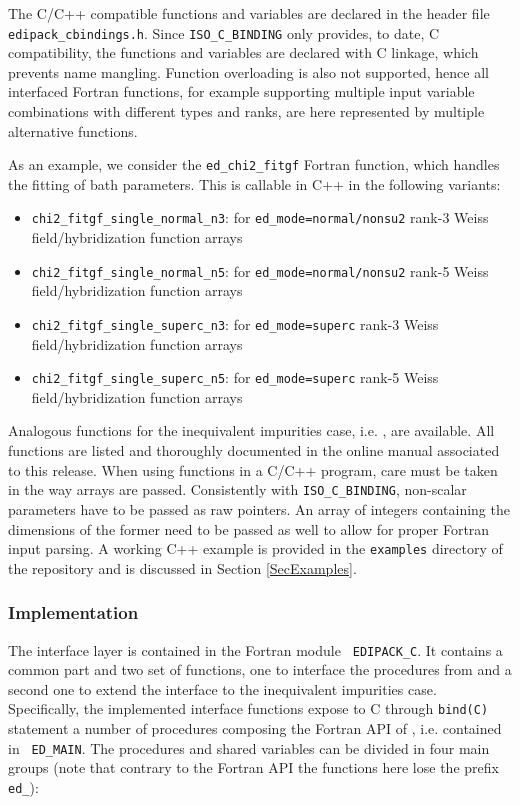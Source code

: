 \documentclass[edipack_sp.tex]{subfiles}
\begin{document}
The C/C++ compatible functions and variables 
are declared in the header file {\tt e\-di\-pack\_c\-bin\-din\-gs.h}.
Since {\tt ISO\_C\_BINDING} only provides, to date, C compatibility, the 
functions and variables are declared with C linkage, which prevents name mangling.
Function overloading is also not supported, hence all interfaced Fortran functions, for example supporting multiple input variable combinations with different types and ranks, are here represented by multiple alternative functions.

As an example, we consider the {\tt ed\_chi2\_fitgf} Fortran function, which handles the fitting of bath parameters. This is callable in C++ in the following variants:
\begin{itemize}
    \item  {\tt chi2\_fitgf\_single\_normal\_n3}: for {\tt ed\_mode=normal/nonsu2} rank-3 Weiss field/hybridization function arrays
    \item  {\tt chi2\_fitgf\_single\_normal\_n5}: for {\tt ed\_mode=normal/nonsu2} rank-5 Weiss field/hybridization function arrays
    \item  {\tt chi2\_fitgf\_single\_superc\_n3}: for {\tt ed\_mode=superc} rank-3 Weiss field/hybridization function arrays
    \item  {\tt chi2\_fitgf\_single\_superc\_n5}: for {\tt ed\_mode=superc} rank-5 Weiss field/hybridization function arrays
\end{itemize}
Analogous functions for the inequivalent impurities case, i.e. , are available. All functions are listed and thoroughly documented in the online manual associated to this release. 
When using \NAME functions in a C/C++ program, care must be taken in the way arrays are passed. Consistently with {\tt ISO\_C\_BINDING}, non-scalar parameters have to be passed as raw pointers. An array of integers containing the dimensions of the former need to be passed as well to allow for proper Fortran input parsing. A working C++ example is provided in the {\tt examples} directory of the \NAME repository and is discussed in Section \ref{SecExamples}.

\subsubsection{Implementation}\label{sSecInteropCbindingsImplementation}
The interface layer is contained in the Fortran module {\tt
  EDIPACK\_C}. It contains a common part and two set of functions,
one to interface the procedures from \NAME and a second
one to extend the interface to the inequivalent impurities case.
Specifically, the implemented interface functions expose to C through
{\tt bind(C)} statement a number of
procedures composing the Fortran API of \NAME, i.e. contained in {\tt
  ED\_MAIN}. The procedures and shared variables can be divided in four main groups (note that contrary to the Fortran API the functions here lose the prefix {\tt ed\_}):
\end{document}
